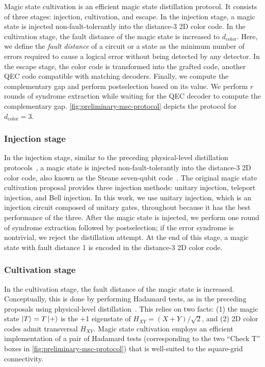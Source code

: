 Magic state cultivation is an efficient magic state distillation protocol.
It consists of three stages: injection, cultivation, and escape.
In the injection stage, a magic state is injected non-fault-tolerantly into the distance-3 2D color code.
In the cultivation stage, the fault distance of the magic state is increased to $d_{\mathrm{color}}$.
Here, we define the \textit{fault distance} of a circuit or a state as the minimum number of errors required to cause a logical error without being detected by any detector.
In the escape stage, the color code is transformed into the grafted code, another QEC code compatible with matching decoders.
Finally, we compute the complementary gap and perform postselection based on its value.
We perform $r$ rounds of syndrome extraction while waiting for the QEC decoder to compute the complementary gap.
\autoref{fig:preliminary-msc-protocol} depicts the protocol for $d_{\mathrm{color}} = 3$.

\subsubsection{Injection stage}
\label{subsec:preliminary-magic-state-cultivation-injection}
In the injection stage, similar to the preceding physical-level distillation protocols~\cite{Goto2016Minimizing, itogawa2025efficient}, a magic state is injected non-fault-tolerantly into the distance-3 2D color code, also known as the Steane seven-qubit code~\cite{Steane1996ErrorCorrecting}.
The original magic state cultivation proposal provides three injection methods: unitary injection, teleport injection, and Bell injection.
In this work, we use unitary injection, which is an injection circuit composed of unitary gates, throughout because it has the best performance of the three.
After the magic state is injected, we perform one round of syndrome extraction followed by postselection; if the error syndrome is nontrivial, we reject the distillation attempt.
At the end of this stage, a magic state with fault distance 1 is encoded in the distance-3 2D color code.

\subsubsection{Cultivation stage}
\label{subsec:preliminary-magic-state-cultivation-cultivation}
In the cultivation stage, the fault distance of the magic state is increased.
Conceptually, this is done by performing Hadamard tests, as in the preceding proposals using physical-level distillation~\cite{Goto2016Minimizing, chamberland2020very, itogawa2025efficient}.
This relies on two facts: (1) the magic state $\ket{T} = T\ket{+}$ is the +1 eigenstate of $H_{XY} = (X + Y) / \sqrt{2}$, and (2) 2D color codes admit transversal $H_{XY}$.
Magic state cultivation employs an efficient implementation of a pair of Hadamard tests (corresponding to the two ``Check T'' boxes in \autoref{fig:preliminary-msc-protocol}) that is well-suited to the square-grid connectivity.

